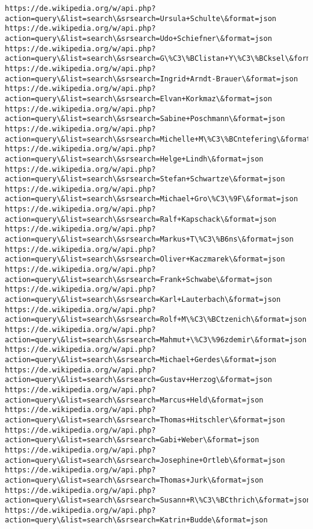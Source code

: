 \documentclass[11pt]{article}
\begin{document}
\begin{Verbatim}[commandchars=\\\{\}]
https://de.wikipedia.org/w/api.php?action=query\&list=search\&srsearch=Ursula+Schulte\&format=json
https://de.wikipedia.org/w/api.php?action=query\&list=search\&srsearch=Udo+Schiefner\&format=json
https://de.wikipedia.org/w/api.php?action=query\&list=search\&srsearch=G\%C3\%BClistan+Y\%C3\%BCksel\&format=json
https://de.wikipedia.org/w/api.php?action=query\&list=search\&srsearch=Ingrid+Arndt-Brauer\&format=json
https://de.wikipedia.org/w/api.php?action=query\&list=search\&srsearch=Elvan+Korkmaz\&format=json
https://de.wikipedia.org/w/api.php?action=query\&list=search\&srsearch=Sabine+Poschmann\&format=json
https://de.wikipedia.org/w/api.php?action=query\&list=search\&srsearch=Michelle+M\%C3\%BCntefering\&format=json
https://de.wikipedia.org/w/api.php?action=query\&list=search\&srsearch=Helge+Lindh\&format=json
https://de.wikipedia.org/w/api.php?action=query\&list=search\&srsearch=Stefan+Schwartze\&format=json
https://de.wikipedia.org/w/api.php?action=query\&list=search\&srsearch=Michael+Gro\%C3\%9F\&format=json
https://de.wikipedia.org/w/api.php?action=query\&list=search\&srsearch=Ralf+Kapschack\&format=json
https://de.wikipedia.org/w/api.php?action=query\&list=search\&srsearch=Markus+T\%C3\%B6ns\&format=json
https://de.wikipedia.org/w/api.php?action=query\&list=search\&srsearch=Oliver+Kaczmarek\&format=json
https://de.wikipedia.org/w/api.php?action=query\&list=search\&srsearch=Frank+Schwabe\&format=json
https://de.wikipedia.org/w/api.php?action=query\&list=search\&srsearch=Karl+Lauterbach\&format=json
https://de.wikipedia.org/w/api.php?action=query\&list=search\&srsearch=Rolf+M\%C3\%BCtzenich\&format=json
https://de.wikipedia.org/w/api.php?action=query\&list=search\&srsearch=Mahmut+\%C3\%96zdemir\&format=json
https://de.wikipedia.org/w/api.php?action=query\&list=search\&srsearch=Michael+Gerdes\&format=json
https://de.wikipedia.org/w/api.php?action=query\&list=search\&srsearch=Gustav+Herzog\&format=json
https://de.wikipedia.org/w/api.php?action=query\&list=search\&srsearch=Marcus+Held\&format=json
https://de.wikipedia.org/w/api.php?action=query\&list=search\&srsearch=Thomas+Hitschler\&format=json
https://de.wikipedia.org/w/api.php?action=query\&list=search\&srsearch=Gabi+Weber\&format=json
https://de.wikipedia.org/w/api.php?action=query\&list=search\&srsearch=Josephine+Ortleb\&format=json
https://de.wikipedia.org/w/api.php?action=query\&list=search\&srsearch=Thomas+Jurk\&format=json
https://de.wikipedia.org/w/api.php?action=query\&list=search\&srsearch=Susann+R\%C3\%BCthrich\&format=json
https://de.wikipedia.org/w/api.php?action=query\&list=search\&srsearch=Katrin+Budde\&format=json

\end{Verbatim}
\end{document}
